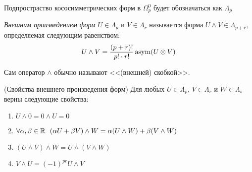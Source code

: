 \begin{designation}
	Подпростраство кососимметрических форм в $\Omega_p^0$ будет обозначаться как $\Lambda_p$
\end{designation}

\begin{definition}
	\textit{Внешним произведением форм} $U \in \Lambda_p$ и $V \in \Lambda_r$ называется форма $U \wedge V \in \Lambda_{p + r}$, определяемая следующим равенством:
	\[
		U \wedge V = \frac{(p + r)!}{p! \cdot r!} \operatorname{asym}(U \otimes V)
	\]
\end{definition}

\begin{note}
	Сам оператор $\wedge$ обычно называют <<(внешней) скобкой>>.
\end{note}

\begin{theorem} (Свойства внешнего произведения форм)
	Для любых $U \in \Lambda_p$, $V \in \Lambda_r$ и $W \in \Lambda_s$ верны следующие свойства:
	\begin{enumerate}
		\item $U \wedge 0 = 0 \wedge U = 0$
		
		\item $\forall \alpha, \beta \in \R\ \ (\alpha U + \beta V) \wedge W = \alpha(U \wedge W) + \beta(V \wedge W)$
		
		\item $(U \wedge V) \wedge W = U \wedge (V \wedge W)$
		
		\item $V \wedge U = (-1)^{pr} U \wedge V$
	\end{enumerate}
\end{theorem}

